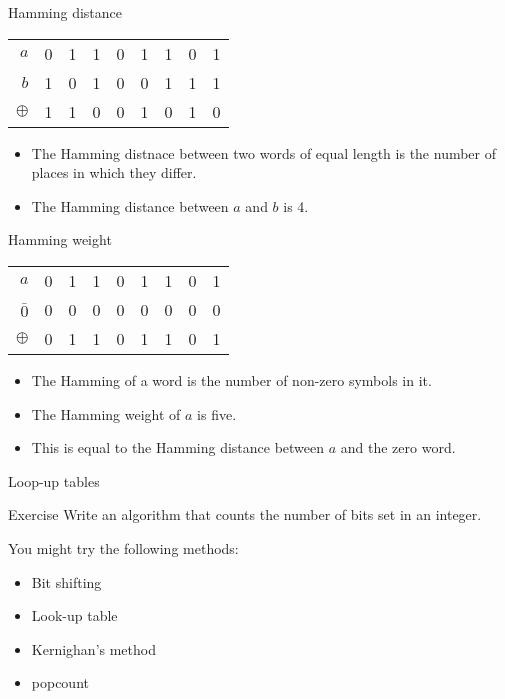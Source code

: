 \begin{frame}{Hamming distance}
  \begin{table}
    \centering
    \begin{tabular}{rcccccccc}
      \toprule
      $a$      & 0 & 1 & 1 & 0 & 1 & 1 & 0 & 1 \\
      $b$      & 1 & 0 & 1 & 0 & 0 & 1 & 1 & 1 \\
      \midrule
      $\oplus$ & 1 & 1 & 0 & 0 & 1 & 0 & 1 & 0 \\
      \bottomrule
    \end{tabular}
  \end{table}
  \begin{itemize}
    \item The Hamming distnace between two words of equal length is the number of places in which they differ.
    \item The Hamming distance between $a$ and $b$ is 4.
  \end{itemize}
\end{frame}

\begin{frame}{Hamming weight}
  \begin{table}
    \centering
    \begin{tabular}{rcccccccc}
      \toprule
      $a$      & 0 & 1 & 1 & 0 & 1 & 1 & 0 & 1 \\
      $\bar{0}$      & 0 & 0 & 0 & 0 & 0 & 0 & 0 & 0 \\
      \midrule
      $\oplus$ & 0 & 1 & 1 & 0 & 1 & 1 & 0 & 1 \\
      \bottomrule
    \end{tabular}
  \end{table}
  \begin{itemize}
    \item The Hamming of a word is the number of non-zero symbols in it.
    \item The Hamming weight of $a$ is five.
    \item This is equal to the Hamming distance between $a$ and the zero word.
  \end{itemize}
\end{frame}


\begin{frame}{Loop-up tables}
  \begin{exampleblock}{Exercise}
    Write an algorithm that counts the number of bits set in an integer.
  \end{exampleblock}
  
  \pause
  
  You might try the following methods:
  \begin{itemize}
    \item Bit shifting
    \item Look-up table
    \item Kernighan's method
    \item popcount
  \end{itemize}
\end{frame}